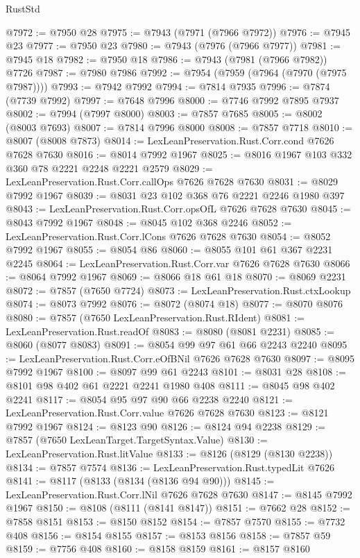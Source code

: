 \begin{lexlean}{RustStd}
\begin{coremodule}
@7972 := @7950 @28
@7975 := @7943 (@7971 (@7966 @7972))
@7976 := @7945 @23
@7977 := @7950 @23
@7980 := @7943 (@7976 (@7966 @7977))
@7981 := @7945 @18
@7982 := @7950 @18
@7986 := @7943 (@7981 (@7966 @7982)) @7726
@7987 := @7980 @7986
@7992 := @7954 (@7959 (@7964 (@7970 (@7975 @7987))))
@7993 := @7942 @7992
@7994 := @7814 @7935
@7996 := @7874 (@7739 @7992)
@7997 := @7648 @7996
@8000 := @7746 @7992 @7895 @7937
@8002 := @7994 (@7997 @8000)
@8003 := @7857 @7685
@8005 := @8002 (@8003 @7693)
@8007 := @7814 @7996 @8000
@8008 := @7857 @7718
@8010 := @8007 (@8008 @7873)
@8014 := LexLeanPreservation.Rust.Corr.cond @7626 @7628 @7630
@8016 := @8014 @7992 @1967
@8025 := @8016 @1967 @103 @332 @360 @78 @2221 @2248 @2221 @2579
@8029 := LexLeanPreservation.Rust.Corr.callOps @7626 @7628 @7630
@8031 := @8029 @7992 @1967
@8039 := @8031 @23 @102 @368 @76 @2221 @2246 @1980 @397
@8043 := LexLeanPreservation.Rust.Corr.opsOfL @7626 @7628 @7630
@8045 := @8043 @7992 @1967
@8048 := @8045 @102 @368 @2246
@8052 := LexLeanPreservation.Rust.Corr.lCons @7626 @7628 @7630
@8054 := @8052 @7992 @1967
@8055 := @8054 @86
@8060 := @8055 @101 @61 @367 @2231 @2245
@8064 := LexLeanPreservation.Rust.Corr.var @7626 @7628 @7630
@8066 := @8064 @7992 @1967
@8069 := @8066 @18 @61 @18
@8070 := @8069 @2231
@8072 := @7857 (@7650 @7724)
@8073 := LexLeanPreservation.Rust.ctxLookup
@8074 := @8073 @7992
@8076 := @8072 (@8074 @18)
@8077 := @8070 @8076
@8080 := @7857 (@7650 LexLeanPreservation.Rust.RIdent)
@8081 := LexLeanPreservation.Rust.readOf
@8083 := @8080 (@8081 @2231)
@8085 := @8060 (@8077 @8083)
@8091 := @8054 @99 @97 @61 @66 @2243 @2240
@8095 := LexLeanPreservation.Rust.Corr.eOfBNil @7626 @7628 @7630
@8097 := @8095 @7992 @1967
@8100 := @8097 @99 @61 @2243
@8101 := @8031 @28
@8108 := @8101 @98 @402 @61 @2221 @2241 @1980 @408
@8111 := @8045 @98 @402 @2241
@8117 := @8054 @95 @97 @90 @66 @2238 @2240
@8121 := LexLeanPreservation.Rust.Corr.value @7626 @7628 @7630
@8123 := @8121 @7992 @1967
@8124 := @8123 @90
@8126 := @8124 @94 @2238
@8129 := @7857 (@7650 LexLeanTarget.TargetSyntax.Value)
@8130 := LexLeanPreservation.Rust.litValue
@8133 := @8126 (@8129 (@8130 @2238))
@8134 := @7857 @7574
@8136 := LexLeanPreservation.Rust.typedLit @7626
@8141 := @8117 (@8133 (@8134 (@8136 @94 @90)))
@8145 := LexLeanPreservation.Rust.Corr.lNil @7626 @7628 @7630
@8147 := @8145 @7992 @1967
@8150 := @8108 (@8111 (@8141 @8147))
@8151 := @7662 @28
@8152 := @7858 @8151
@8153 := @8150 @8152
@8154 := @7857 @7570
@8155 := @7732 @408
@8156 := @8154 @8155
@8157 := @8153 @8156
@8158 := @7857 @59
@8159 := @7756 @408
@8160 := @8158 @8159
@8161 := @8157 @8160

\end{coremodule}
\end{lexlean}
